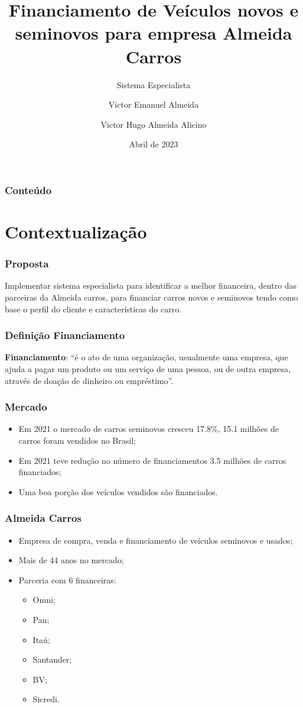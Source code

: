 \documentclass[12pt]{beamer}
\author[Victor * Almeida *]{Victor Emanuel Almeida \and Victor Hugo Almeida Alicino}
\title[Financiamento de veículos]{Financiamento de Veículos novos e seminovos para empresa Almeida Carros}
\subtitle{Sistema Especialista}
\date{Abril de 2023}
\institute{UNIOESTE}
\begin{document}
\frame{\titlepage}

\begin{frame}
    \frametitle{Conteúdo}
    \tableofcontents
\end{frame}

\section{Contextualização}
\begin{frame}
    \frametitle{Proposta}

    \large Implementar sistema especialista para identificar a melhor financeira, dentro das parceiras da Almeida carros, para financiar carros novos e seminovos tendo como base o perfil do cliente e características do carro.

\end{frame}

\begin{frame}
    \frametitle{Definição Financiamento}
    \textbf{Financiamento}: ``é o ato de uma organização, usualmente uma empresa, que ajuda a pagar um produto ou um serviço de uma pessoa, ou de outra empresa, através de doação de dinheiro ou empréstimo''\cite{financiamento}.
\end{frame}

\begin{frame}
    \frametitle{Mercado}
    \begin{itemize}
        \item Em 2021 o mercado de carros seminovos cresceu 17.8\%, 15.1 milhões de carros foram vendidos no Brasil\cite{mercado_seminovos};
        \item Em 2021 teve redução no número de financiamentos 3.5 milhões de carros financiados\cite{financiamento_2022};
        \item Uma boa porção dos veículos vendidos são financiados.
    \end{itemize}
\end{frame}

\begin{frame}
    \frametitle{Almeida Carros}
    \begin{itemize}
        \item Empresa de compra, venda e financiamento de veículos seminovos e usados;
        \item Mais de 44 anos no mercado;
        \item Parceria com 6 financeiras:
        \begin{itemize}
            \item Omni;
            \item Pan;
            \item Itaú;
            \item Santander;
            \item BV;
            \item Sicredi.
        \end{itemize}
    \end{itemize}
\end{frame}
\end{document}
